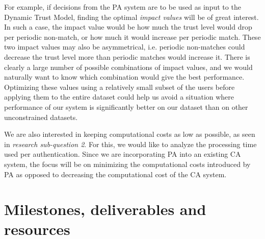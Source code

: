 \documentclass[informationsecurity]{gucmasterproject}
\begin{document}
For example, if decisions from the PA system are to be used as input to the Dynamic Trust Model, finding the optimal \textit{impact values} will be of great interest.
In such a case, the impact value would be how much the trust level would drop per periodic non-match, or how much it would increase per periodic match.
These two impact values may also be asymmetrical, i.e. periodic non-matches could decrease the trust level more than periodic matches would increase it.
There is clearly a large number of possible combinations of impact values, and we would naturally want to know which combination would give the best performance.
Optimizing these values using a relatively small subset of the users before applying them to the entire dataset could help us avoid a situation where performance of our system is significantly better on our dataset than on other unconstrained datasets.

We are also interested in keeping computational costs as low as possible, as seen in \textit{research sub-question 2}.
For this, we would like to analyze the processing time used per authentication.
Since we are incorporating PA into an existing CA system, the focus will be on minimizing the computational costs introduced by PA as opposed to decreasing the computational cost of the CA system.








\chapter{Milestones, deliverables and resources}
\label{chap:milestones}
\end{document}
